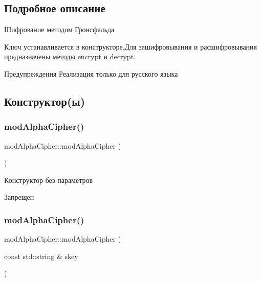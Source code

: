 \subsection{Подробное описание}
Шифрование методом Гронсфельда 

Ключ устанавливается в конструкторе.\+Для зашифровывания и расшифровывания предназначены методы encrypt и decrypt. \begin{DoxyWarning}{Предупреждения}
Реализация только для русского языка 
\end{DoxyWarning}


\subsection{Конструктор(ы)}
\mbox{\label{classmodAlphaCipher_a4f0a86c20f5d836f66cb1e640d875e6b}} 
\subsubsection{\texorpdfstring{mod\+Alpha\+Cipher()}{modAlphaCipher()}\hspace{0.1cm}{\footnotesize\ttfamily [1/2]}}
{\footnotesize\ttfamily mod\+Alpha\+Cipher\+::mod\+Alpha\+Cipher (\begin{DoxyParamCaption}{ }\end{DoxyParamCaption})\hspace{0.3cm}{\ttfamily [delete]}}



Конструктор без параметров 

Запрещен \mbox{\label{classmodAlphaCipher_a76a420025b3c08f72c9b996d83c6ff09}} 
\subsubsection{\texorpdfstring{mod\+Alpha\+Cipher()}{modAlphaCipher()}\hspace{0.1cm}{\footnotesize\ttfamily [2/2]}}
{\footnotesize\ttfamily mod\+Alpha\+Cipher\+::mod\+Alpha\+Cipher (\begin{DoxyParamCaption}\item[{const std\+::string \&}]{skey }\end{DoxyParamCaption})}



